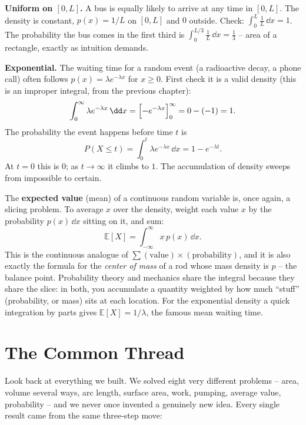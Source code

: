 \begin{example}
\label{ch26:ex-density}
\textbf{Uniform on $[0,L]$.} A bus is equally likely to arrive at any time in
$[0,L]$. The density is constant, $p(x) = 1/L$ on $[0,L]$ and $0$ outside. Check:
$\int_0^L \tfrac1L\,\dd x = 1$. The probability the bus comes in the first third is
$\int_0^{L/3}\tfrac1L\,\dd x = \tfrac13$ -- area of a rectangle, exactly as
intuition demands.

\textbf{Exponential.} The waiting time for a random event (a radioactive decay, a
phone call) often follows $p(x) = \lambda e^{-\lambda x}$ for $x\ge 0$. First check
it is a valid density (this is an improper integral, from the previous chapter):
\[
  \int_0^{\infty}\lambda e^{-\lambda x}\,\dd x
  = \Bigl[-e^{-\lambda x}\Bigr]_0^{\infty}
  = 0 - (-1) = 1.
\]
The probability the event happens before time $t$ is
\[
  P(X \le t) = \int_0^t \lambda e^{-\lambda x}\,\dd x
             = 1 - e^{-\lambda t}.
\]
At $t=0$ this is $0$; as $t\to\infty$ it climbs to $1$. The accumulation of density
sweeps from impossible to certain.
\end{example}

\begin{applicationbox}
The \textbf{expected value} (mean) of a continuous random variable is, once again,
a slicing problem. To average $x$ over the density, weight each value $x$ by the
probability $p(x)\,\dd x$ sitting on it, and sum:
\[
  \mathbb{E}[X] = \int_{-\infty}^{\infty} x\,p(x)\,\dd x.
\]
This is the continuous analogue of $\sum (\text{value})\times(\text{probability})$,
and it is also exactly the formula for the \emph{center of mass} of a rod whose
mass density is $p$ -- the balance point. Probability theory and mechanics share
the integral because they share the slice: in both, you accumulate a quantity
weighted by how much ``stuff'' (probability, or mass) sits at each location. For
the exponential density a quick integration by parts gives
$\mathbb{E}[X] = 1/\lambda$, the famous mean waiting time.
\end{applicationbox}

\section{The Common Thread}
\label{ch26:thread}

Look back at everything we built. We solved eight very different problems --
area, volume several ways, arc length, surface area, work, pumping, average value,
probability -- and we never once invented a genuinely new idea. Every single
result came from the same three-step move:

